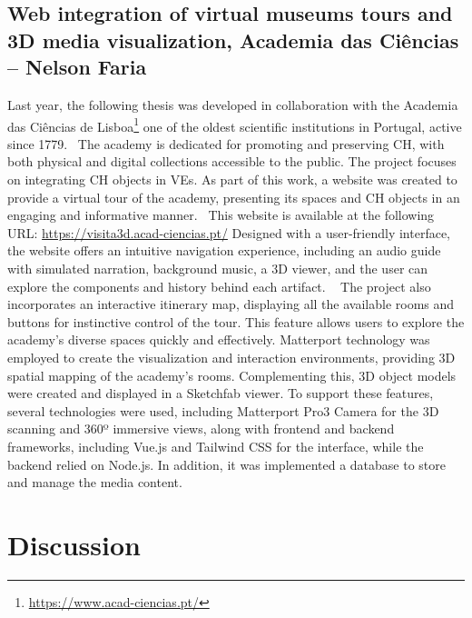 \subsection{Web integration of virtual museums tours and \gls{3D} media visualization, Academia das Ciências – Nelson Faria}
\label{sec:thesis3_nova}

Last year, the following thesis was developed in collaboration with the Academia das Ciências de Lisboa\footnote{\url{https://www.acad-ciencias.pt/}} one of the oldest scientific institutions in Portugal, active since 1779.~\cite{tecnicoAcademia} 
The academy is dedicated for promoting and preserving \gls{CH}, with both physical and digital collections accessible to the public. 
The project focuses on integrating \gls{CH} objects in \glspl{VE}. As part of this work, a website was created to provide a virtual tour of the academy, presenting its spaces and \gls{CH} objects in an engaging and informative manner.~\cite{tese_tourFaria2024} 
This website is available at the following URL: \url{https://visita3d.acad-ciencias.pt/} 
Designed with a user-friendly interface, the website offers an intuitive navigation experience, including an audio guide with simulated narration, background music, a \gls{3D} viewer, and the user can explore the components and history behind each artifact. 
~\cite{academiaCiencias2024} The project also incorporates an interactive itinerary map, displaying all the available rooms and buttons for instinctive control of the tour. This feature allows users to explore the academy's diverse spaces quickly and effectively.
Matterport technology was employed to create the visualization and interaction environments, providing \gls{3D} spatial mapping of the academy's rooms. Complementing this, \gls{3D} object models were created and displayed in a Sketchfab viewer. 
To support these features, several technologies were used, including Matterport Pro3 Camera for the \gls{3D} scanning and 360º immersive views, along with frontend and backend frameworks, including Vue.js and Tailwind CSS for the interface, 
while the backend relied on Node.js. In addition, it was implemented a database to store and manage the media content.

\section{Discussion}
\label{sec:discussion}

\newcommand{\cmark}{\ding{51}} %
\newcommand{\xmark}{\ding{55}} %

